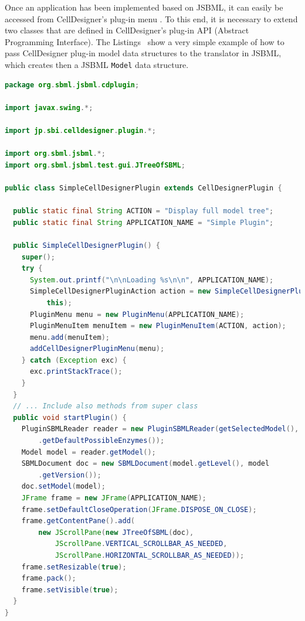 \documentclass[
  letterpaper,
  11pt,
  headsepline,
  pointlessnumbers,
  tablecaptionabove,
  headinclude,
  appendixprefix,
  idxtotoc,
  bibtotoc,
  titlepage
]{scrartcl}
\begin{document}
Once an application has been implemented based on JSBML, it can easily be
accessed from CellDesigner's plug-in menu \citep{Funahashi2003}. To this end,
it is necessary to
extend two classes that are defined in CellDesigner's plug-in API (Abstract
Programming Interface). The Listings~
show a very simple example of how to pass CellDesigner plug-in model data
structures to the translator in JSBML, which creates then a JSBML \verb!Model!
data structure.

% 
\begin{lstlisting}[language=Java,float,caption={A simple example for a
CellDesigner plug-in using JSBML as a communication layer},label=lst:Plugin]
package org.sbml.jsbml.cdplugin;

import javax.swing.*;

import jp.sbi.celldesigner.plugin.*;

import org.sbml.jsbml.*;
import org.sbml.jsbml.test.gui.JTreeOfSBML;

public class SimpleCellDesignerPlugin extends CellDesignerPlugin {

  public static final String ACTION = "Display full model tree";
  public static final String APPLICATION_NAME = "Simple Plugin";

  public SimpleCellDesignerPlugin() {
    super();
    try {
      System.out.printf("\n\nLoading %s\n\n", APPLICATION_NAME);
      SimpleCellDesignerPluginAction action = new SimpleCellDesignerPluginAction(
          this);
      PluginMenu menu = new PluginMenu(APPLICATION_NAME);
      PluginMenuItem menuItem = new PluginMenuItem(ACTION, action);
      menu.add(menuItem);
      addCellDesignerPluginMenu(menu);
    } catch (Exception exc) {
      exc.printStackTrace();
    }
  }
  // ... Include also methods from super class
  public void startPlugin() {
    PluginSBMLReader reader = new PluginSBMLReader(getSelectedModel(), SBO
        .getDefaultPossibleEnzymes());
    Model model = reader.getModel();
    SBMLDocument doc = new SBMLDocument(model.getLevel(), model
        .getVersion());
    doc.setModel(model);
    JFrame frame = new JFrame(APPLICATION_NAME);
    frame.setDefaultCloseOperation(JFrame.DISPOSE_ON_CLOSE);
    frame.getContentPane().add(
        new JScrollPane(new JTreeOfSBML(doc),
            JScrollPane.VERTICAL_SCROLLBAR_AS_NEEDED,
            JScrollPane.HORIZONTAL_SCROLLBAR_AS_NEEDED));
    frame.setResizable(true);
    frame.pack();
    frame.setVisible(true);
  }
}
\end{lstlisting}
\end{document}
